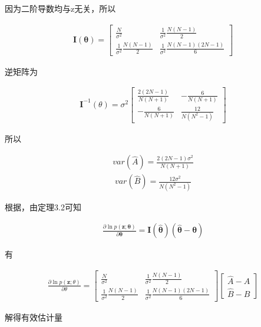 \documentclass[fontset=windows]{article}
\numberwithin{figure}{section}
\begin{document}
因为二阶导数均与z无关，所以

\begin{align*}
	\mathbf{I}(\boldsymbol{\theta})=
	\begin{bmatrix}
		\frac{N}{\sigma^2}                 & \frac{1}{\sigma^2}\frac{N(N-1)}{2}       \\
		\frac{1}{\sigma^2}\frac{N(N-1)}{2} & \frac{1}{\sigma^2}\frac{N(N-1)(2N-1)}{6}
	\end{bmatrix}
\end{align*}

逆矩阵为

\begin{align*}
	\mathbf{I}^{-1}(\theta)=\sigma^2
	\begin{bmatrix}
		\frac{2(2N-1)}{N(N+1)} & -\frac{6}{N(N+1)}   \\
		-\frac{6}{N(N+1)}      & \frac{12}{N(N^2-1)}
	\end{bmatrix}
\end{align*}

所以

\begin{align*}
	var(\hat{A})=\frac{2(2N-1)\sigma^2}{N(N+1)}
\end{align*}
\begin{align*}
	var(\hat{B})=\frac{12\sigma^2}{N(N^2-1)}
\end{align*}

根据，由定理3.2可知

\begin{align*}
	\frac{\partial \ln p(\mathbf{z};\boldsymbol{\theta})}{\partial \boldsymbol{\theta}}=
	\mathbf{I}(\hat{\boldsymbol{\theta}})(\hat{\boldsymbol{\theta}}-\boldsymbol{\theta})
\end{align*}

有

\begin{align*}
	\frac{\partial \ln p(\mathbf{z};\theta)}{\partial \theta}=	\begin{bmatrix}
		\frac{N}{\sigma^2}                 & \frac{1}{\sigma^2}\frac{N(N-1)}{2}       \\
		\frac{1}{\sigma^2}\frac{N(N-1)}{2} & \frac{1}{\sigma^2}\frac{N(N-1)(2N-1)}{6}
	\end{bmatrix}
	\begin{bmatrix}
		\hat{A}-A \\
		\hat{B}-B
	\end{bmatrix}
\end{align*}

解得有效估计量
\end{document}
